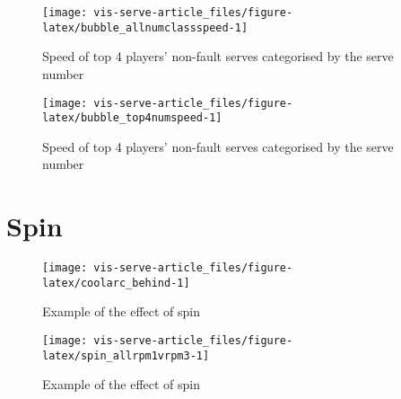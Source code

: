\documentclass[article]{jss}
\begin{document}
\begin{CodeChunk}
\begin{figure}

{\centering \texttt{[image: vis-serve-article\_files/figure-latex/bubble\_allnumclassspeed-1]} 

}

\caption[Speed of top 4 players' non-fault serves categorised by the serve number]{Speed of top 4 players' non-fault serves categorised by the serve number}\label{fig:bubble_allnumclassspeed}
\end{figure}
\end{CodeChunk}

\begin{CodeChunk}
\begin{figure}

{\centering \texttt{[image: vis-serve-article\_files/figure-latex/bubble\_top4numspeed-1]} 

}

\caption[Speed of top 4 players' non-fault serves categorised by the serve number]{Speed of top 4 players' non-fault serves categorised by the serve number}\label{fig:bubble_top4numspeed}
\end{figure}
\end{CodeChunk}

\section{Spin}\label{spin}

\begin{CodeChunk}
\begin{figure}

{\centering \texttt{[image: vis-serve-article\_files/figure-latex/coolarc\_behind-1]} 

}

\caption[Example of the effect of spin]{Example of the effect of spin}\label{fig:coolarc_behind}
\end{figure}
\end{CodeChunk}

\begin{CodeChunk}
\begin{figure}

{\centering \texttt{[image: vis-serve-article\_files/figure-latex/spin\_allrpm1vrpm3-1]} 

}

\caption[Example of the effect of spin]{Example of the effect of spin}\label{fig:spin_allrpm1vrpm3}
\end{figure}
\end{CodeChunk}
\end{document}
